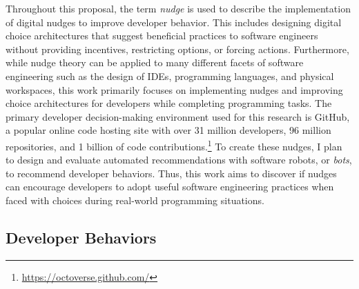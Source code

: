 Throughout this proposal, the term \textit{nudge} is used to describe the implementation of digital nudges to improve developer behavior. This includes designing digital choice architectures that suggest beneficial practices to software engineers without providing incentives, restricting options, or forcing actions. Furthermore, while nudge theory can be applied to many different facets of software engineering such as the design of IDEs, programming languages, and physical workspaces, this work primarily focuses on implementing nudges and improving choice architectures for developers while completing programming tasks. The primary developer decision-making environment used for this research is GitHub, a popular online code hosting site with over 31 million developers, 96 million repositories, and 1 billion of code contributions.\footnote{\url{https://octoverse.github.com/}} To create these nudges, I plan to design and evaluate automated recommendations with software robots, or \textit{bots}, to recommend developer behaviors. Thus, this work aims to discover if nudges can encourage developers to adopt useful software engineering practices when faced with choices during real-world programming situations.
\vspace{-5pt}

\subsection{Developer Behaviors}

